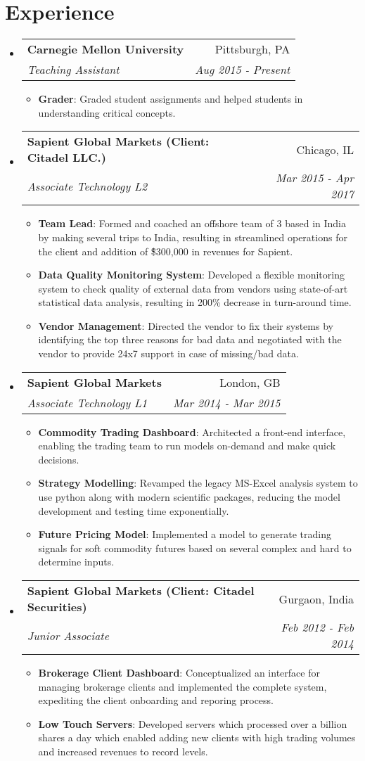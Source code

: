 \documentclass[letterpaper,10.5pt]{article}
\makeatletter
\newcommand{\resumeItem}[2]{
  \item\small{
    \textbf{#1}{: #2 \vspace{-2pt}}
  }
}
\newcommand{\resumeSubheading}[4]{
  \vspace{-1pt}\item
    \begin{tabular*}{0.97\textwidth}{l@{\extracolsep{\fill}}r}
      \textbf{#1} & #2 \\
      \textit{\small#3} & \textit{\small #4} \\
    \end{tabular*}\vspace{-5pt}
}
\newcommand{\resumeSubHeadingListStart}{\begin{itemize}[leftmargin=*]}
\newcommand{\resumeSubHeadingListEnd}{\end{itemize}}
\newcommand{\resumeItemListStart}{\begin{itemize}}
\newcommand{\resumeItemListEnd}{\end{itemize}\vspace{-5pt}}
\makeatother
\begin{document}
\section{Experience}
  \resumeSubHeadingListStart
	 \resumeSubheading
	{Carnegie Mellon University}{Pittsburgh, PA}
	{Teaching Assistant}{Aug 2015 -  Present}
	\resumeItemListStart
	\resumeItem{Grader}
	{Graded student assignments and helped students in understanding critical concepts.}
	\resumeItemListEnd
	
    \resumeSubheading
      {Sapient Global Markets (Client: Citadel LLC.)}{Chicago, IL}
      {Associate Technology L2}{Mar 2015 - Apr 2017}
      \resumeItemListStart
        \resumeItem{Team Lead}
          {Formed and coached an offshore team of 3 based in India by making several trips to India, resulting in streamlined operations for the client and addition of \~\$300,000 in revenues for Sapient.}
          \resumeItem{Data Quality Monitoring System}
          {Developed a flexible monitoring system to check quality of external data from vendors using state-of-art statistical data analysis, resulting in 200\% decrease in turn-around time.}
          \resumeItem{Vendor Management}{Directed the vendor to fix their systems by identifying the top three reasons for bad data and negotiated with the vendor to provide 24x7 support in case of missing/bad data.}
      \resumeItemListEnd

    \resumeSubheading
	{Sapient Global Markets}{London, GB}
	{Associate Technology L1}{Mar 2014 - Mar 2015}
    \resumeItemListStart
    \resumeItem{Commodity Trading Dashboard}
    {Architected a front-end interface, enabling the trading team to run models on-demand and make quick decisions.}
    \resumeItem{Strategy Modelling}
    {Revamped the legacy MS-Excel analysis system to use python along with modern scientific packages, reducing the model development and testing time exponentially.}
    \resumeItem{Future Pricing Model}{Implemented a model to generate trading signals for soft commodity futures based on several complex and hard to determine inputs.}
    \resumeItemListEnd

    \resumeSubheading
    {Sapient Global Markets (Client: Citadel Securities)}{Gurgaon, India}
    {Junior Associate}{Feb 2012 - Feb 2014}
    \resumeItemListStart
    \resumeItem{Brokerage Client Dashboard}
    {Conceptualized an interface for managing brokerage clients and implemented the complete system, expediting the client onboarding and reporing process.}
    \resumeItem{Low Touch Servers}{Developed servers which processed over a billion shares a day which enabled adding new clients with high trading volumes and increased revenues to record levels.}
    \resumeItemListEnd
\resumeSubHeadingListEnd
\end{document}
